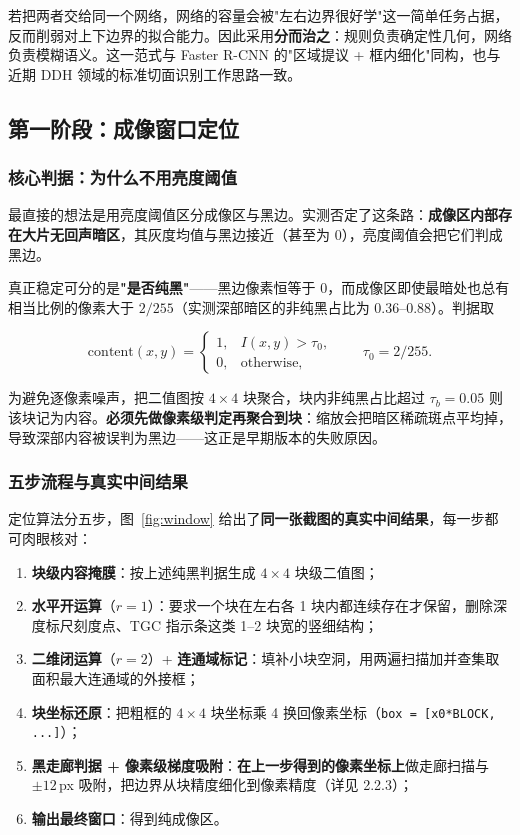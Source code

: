 \documentclass[UTF8,a4paper,10pt]{ctexart}
\begin{document}
\noindent 若把两者交给同一个网络，网络的容量会被"左右边界很好学"这一简单任务占据，反而削弱对上下边界的拟合能力。因此采用\textbf{分而治之}：规则负责确定性几何，网络负责模糊语义。这一范式与 Faster R-CNN 的"区域提议 + 框内细化"同构\cite{ren2015fasterrcnn}，也与近期 DDH 领域的标准切面识别工作思路一致\cite{ahn2025standardplane}。

\subsection{第一阶段：成像窗口定位}

\subsubsection{核心判据：为什么不用亮度阈值}

最直接的想法是用亮度阈值区分成像区与黑边。实测否定了这条路：\textbf{成像区内部存在大片无回声暗区}，其灰度均值与黑边接近（甚至为 0），亮度阈值会把它们判成黑边。

真正稳定可分的是\textbf{"是否纯黑"}——黑边像素恒等于 0，而成像区即使最暗处也总有相当比例的像素大于 $2/255$（实测深部暗区的非纯黑占比为 0.36--0.88）。判据取

\begin{equation}
\mathrm{content}(x,y)=\begin{cases}1, & I(x,y)>\tau_0,\\ 0, & \text{otherwise},\end{cases}\qquad \tau_0=2/255 .
\end{equation}

\noindent 为避免逐像素噪声，把二值图按 $4\times4$ 块聚合，块内非纯黑占比超过 $\tau_b=0.05$ 则该块记为内容。\textbf{必须先做像素级判定再聚合到块}：缩放会把暗区稀疏斑点平均掉，导致深部内容被误判为黑边——这正是早期版本的失败原因。

\subsubsection{五步流程与真实中间结果}

定位算法分五步，图~\ref{fig:window} 给出了\textbf{同一张截图的真实中间结果}，每一步都可肉眼核对：

\begin{enumerate}[leftmargin=1.6em,itemsep=1.2pt,topsep=2pt]
\item \textbf{块级内容掩膜}：按上述纯黑判据生成 $4\times4$ 块级二值图；
\item \textbf{水平开运算}（$r=1$）：要求一个块在左右各 1 块内都连续存在才保留，删除深度标尺刻度点、TGC 指示条这类 1--2 块宽的竖细结构；
\item \textbf{二维闭运算}（$r=2$）+ \textbf{连通域标记}：填补小块空洞，用两遍扫描加并查集取面积最大连通域的外接框；
\item \textbf{块坐标还原}：把粗框的 $4\times4$ 块坐标乘 4 换回像素坐标（\texttt{box = [x0*BLOCK, ...]}）；
\item \textbf{黑走廊判据 + 像素级梯度吸附}：\textbf{在上一步得到的像素坐标上}做走廊扫描与 $\pm12$\,px 吸附，把边界从块精度细化到像素精度（详见 2.2.3）；
\item \textbf{输出最终窗口}：得到纯成像区。
\end{enumerate}
\end{document}
